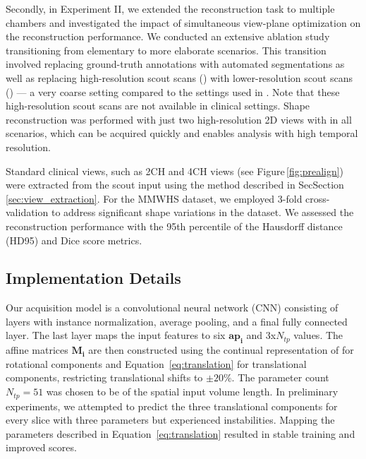     Secondly, in Experiment II, we extended the reconstruction task to multiple chambers and investigated the impact of simultaneous view-plane optimization on the reconstruction performance. We conducted an extensive ablation study transitioning from elementary to more elaborate scenarios. This transition involved replacing ground-truth annotations with automated segmentations as well as replacing high-resolution scout scans ()
    with lower-resolution scout scans () --- a very coarse setting compared to the settings used in \citep{kellman2011automatic}. Note that these high-resolution scout scans are not available in clinical settings.
    Shape reconstruction was performed with just two high-resolution 2D views with  in all scenarios, which can be acquired quickly and enables analysis with high temporal resolution.

    Standard clinical views, such as 2CH and 4CH views (see Figure\,\ref{fig:prealign}) were extracted from the scout input using the method described in SecSection\,\ref{sec:view_extraction}.
    For the MMWHS dataset, we employed 3-fold cross-validation to address significant shape variations in the dataset. We assessed the reconstruction performance with the 95th percentile of the Hausdorff distance (HD95) and Dice score metrics.

    \subsection{Implementation Details}
    \label{sec:implementation}
     Our acquisition model is a convolutional neural network (CNN) consisting of layers with instance normalization, average pooling, and a final fully connected layer. The last layer maps the input features to six $\mathbf{ap_i}$ and 3x$N_{tp}$  values.
    The affine matrices $\mathbf{M_i}$ are then constructed using the continual representation of \citep{zhou2019continuity} for rotational components and Equation \,\eqref{eq:translation} for translational components, restricting translational shifts to $\pm20\%$.
    The parameter count $N_{tp}=51$ was chosen to be  of the spatial input volume length.
    In preliminary experiments, we attempted to predict the three translational components for every slice with three parameters but experienced instabilities. Mapping the parameters described in Equation \,\eqref{eq:translation} resulted in stable training and improved scores.

